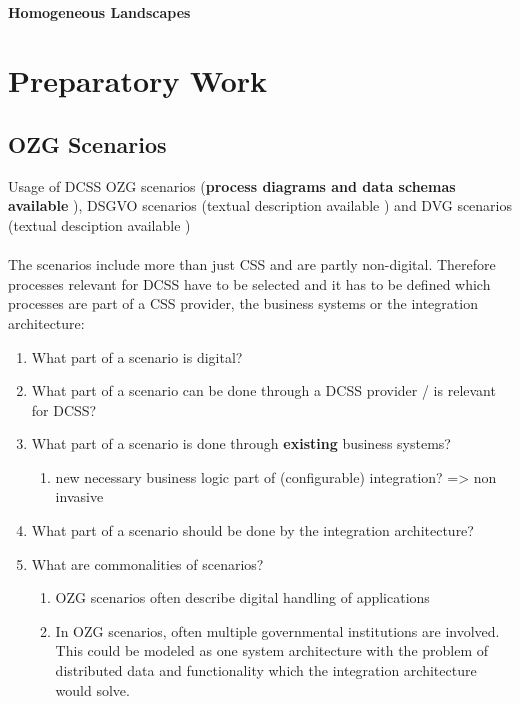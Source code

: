 \documentclass[
     12pt,         %
     a4paper,      %
     BCOR10mm,     %
     DIV14,        %
aragraph skip instad of paragraph indent
     ]{scrreprt}
\begin{document}
\subsubsection{Homogeneous Landscapes}


\chapter{Preparatory Work}

\section{OZG Scenarios}


Usage of DCSS OZG scenarios (\textbf{process diagrams and data schemas available}
\cite{ozgScenarios}), DSGVO scenarios (textual description available \cite{dsgvo}) and DVG scenarios
(textual desciption available \cite{gematik-e-rezept})
\\\\
The scenarios include more than just CSS and are partly non-digital. Therefore processes relevant for DCSS have to be selected
and it has to be defined which processes are part of a CSS provider, the business systems or the integration architecture:

\begin{enumerate}
     \item What part of a scenario is digital?
     \item What part of a scenario can be done through a DCSS provider / is relevant for DCSS?
     \item What part of a scenario is done through \textbf{existing} business systems?
           \begin{enumerate}
                \item new necessary business logic part of (configurable) integration? => non invasive
           \end{enumerate}
     \item What part of a scenario should be done by the integration architecture?
     \item What are commonalities of scenarios?
           \begin{enumerate}
                \item OZG scenarios often describe digital handling of applications
                \item In OZG scenarios, often multiple governmental institutions are involved. This could be modeled as one system architecture with the problem of distributed
                      data and functionality which the integration architecture would solve.
           \end{enumerate}
\end{enumerate}
\end{document}

